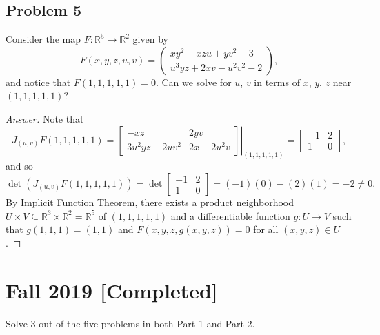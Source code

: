 \documentclass[12pt]{article}
\newcommand{\real}{\mathbb{R}}
\newcommand\paren[1]{\left( #1 \right)}
\theoremstyle{definition}
\begin{document}
\subsection{Problem 5 \texorpdfstring{\cite{Rudin}}{}}
Consider the map $F : \real^5 \to \real^2$ given by 
\[
    F(x,y,z,u,v) = 
    \begin{pmatrix}
        xy^2 - xzu + yv^2 - 3 \\ 
        u^3yz + 2xv - u^2v^2 - 2
    \end{pmatrix} , 
\]
and notice that $F(1,1,1,1,1) = 0$. Can we solve for $u$, $v$ in terms of $x$, $y$, $z$ near $(1,1,1,1,1)$?
\begin{proof}[Answer]
    Note that 
    \[
        J_{(u,v)} F(1,1,1,1,1) = 
        \left. 
        \begin{bmatrix}
            -xz & 2yv \\ 
            3u^2 yz - 2u v^2 & 2x - 2u^2 v
        \end{bmatrix}
        \right|_{(1,1,1,1,1)} = 
        \begin{bmatrix}
            -1 & 2 \\ 
            1 & 0
        \end{bmatrix} , 
    \]
    and so 
    \[
        \det \paren{ J_{(u,v)} F(1,1,1,1,1) } = 
        \det
        \begin{bmatrix}
            -1 & 2 \\ 
            1 & 0
        \end{bmatrix} 
        = (-1)(0) - (2)(1) = -2 \neq 0 . 
    \]
    By Implicit Function Theorem, there exists a product neighborhood $U \times V \subseteq \real^3 \times \real^2 = \real^5$ of $(1,1,1,1,1)$ and a differentiable function $g : U \to V$ such that $g(1,1,1) = (1,1)$ and $F(x,y,z,g(x,y,z)) = 0$ for all $(x,y,z) \in U$. 
\end{proof}

\newpage
\section{Fall 2019 [Completed]}
Solve 3 out of the five problems in both Part 1 and Part 2.
\end{document}
